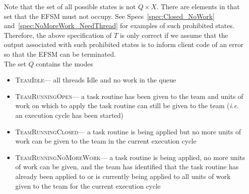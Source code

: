 \documentclass{article}
\newcommand{\TeamIdle}          {\textsc{TeamIdle}}
\newcommand{\TeamRunningOpen}   {\textsc{TeamRunningOpen}}
\newcommand{\TeamRunningClosed} {\textsc{TeamRunningClosed}}
\newcommand{\TeamRunningNoMoreWork} {\textsc{TeamRunningNoMoreWork}}
\newcommand{\TeamTerminating}   {\textsc{TeamTerminating}}
\newcommand{\taskroutine}        {task routine\xspace}
\begin{document}
Note that the set of all possible states is not $Q \times X$.  There are
elements in that set that the EFSM must not occupy.  See
Specs~\ref{spec:Closed_NoWork} and~\ref{spec:NoMoreWork_NeedThread} for examples
of such prohibited states.  Therefore, the above specification of $T$ is only
correct if we assume that the output associated with such prohibited states is
to inform client code of an error so that the EFSM can be terminated.\\

The set $Q$ contains the modes
\begin{itemize}
\item{\TeamIdle --- all threads Idle and no work in the queue}
\item{\TeamRunningOpen --- a \taskroutine has been given to the team and units of work
on which to apply the \taskroutine can still be given to the team (\textit{i.e.} an
execution cycle has been started)}
\item{\TeamRunningClosed --- a \taskroutine is being applied but no more units
of work can be given to the team in the current execution cycle}
\item{\TeamRunningNoMoreWork --- a \taskroutine is being applied, no more
units of work can be given, and the team has identified that the \taskroutine has
already been applied to or is currently being applied to all units of work given
to the team for the current execution cycle}
\end{itemize}
\end{document}
